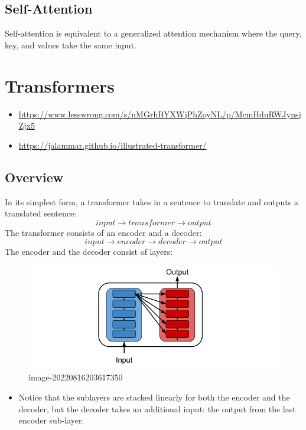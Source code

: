 \documentclass[
]{book}
\providecommand{\tightlist}{%
  \setlength{\itemsep}{0pt}\setlength{\parskip}{0pt}}
\begin{document}
\hypertarget{self-attention}{%
\subsection{Self-Attention}\label{self-attention}}

Self-attention is equivalent to a generalized attention mechanism where the query, key, and values take the same input.

\hypertarget{transformers}{%
\section{Transformers}\label{transformers}}

\begin{itemize}
\tightlist
\item
  \url{https://www.lesswrong.com/s/nMGrhBYXWjPhZoyNL/p/McmHduRWJynsjZjx5}
\item
  \url{https://jalammar.github.io/illustrated-transformer/}
\end{itemize}

\hypertarget{overview-1}{%
\subsection{Overview}\label{overview-1}}

In its simplest form, a transformer takes in a sentence to translate and outputs a translated sentence:
\[
input \to transformer \to output
\]
The transformer consists of an encoder and a decoder:
\[
input \to encoder \to decoder \to output
\]
The encoder and the decoder consist of layers:

\begin{figure}
\centering
\includegraphics{Figures/transformers_02.png}
\caption{image-20220816203617350}
\end{figure}

\begin{itemize}
\tightlist
\item
  Notice that the sublayers are stacked linearly for both the encoder and the decoder, but the decoder takes an additional input: the output from the last encoder sub-layer.
\end{itemize}
\end{document}
